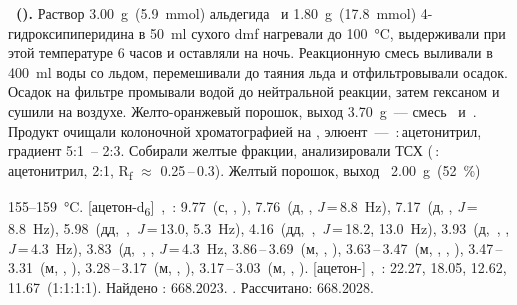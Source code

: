 \textbf{~().}
Раствор \SI{3.00}{\gram}~(\SI{5.9}{\mmol}) альдегида~ и \SI{1.80}{\gram}~(\SI{17.8}{\mmol}) 4-гидроксипиперидина в \SI{50}{\milli\litre} сухого \ac{dmf} нагревали до \SI{100}{\celsius}, выдерживали при этой температуре 6 часов и оставляли на ночь.
Реакционную смесь выливали в \SI{400}{\milli\litre} воды со льдом, перемешивали до таяния льда и отфильтровывали осадок.
Осадок на фильтре промывали водой до нейтральной реакции, затем гексаном и сушили на воздухе.
Желто-оранжевый порошок, выход \SI{3.70}{\gram}~--- смесь~ и~.
Продукт очищали колоночной хроматографией на , элюент~--- \,:\,ацетонитрил, градиент 5:1~-- 2:3. Собирали желтые фракции, анализировали ТСХ (\,:\,ацетонитрил, 2:1, R\textsubscript{f} $\approx$ 0.25\,--\,0.3).
Желтый порошок, выход~ \SI{2.00}{\gram}~(\SI{52}{\percent})
\begin{experimental}[]
     155--\SI{159}{\celsius}.
    [ацетон­-d\textsubscript{6}]~\chemdelta{},~\si{\ppm}: 9.77~(с, , ), 7.76~(д, , \textit{J}\,=\,8.8~\si{\hertz}), 7.17~(д, , \textit{J}\,=\,8.8~\si{\hertz}), 5.98~(дд,~,~\textit{J}\,=\,13.0, 5.3~\si{\hertz}), 4.16~(дд,~,~\textit{J}\,=\,18.2, 13.0~\si{\hertz}), 3.93~(д,~, , \textit{J}\,=\,4.3~\si{\hertz}), 3.83~(д,~, , \textit{J}\,=\,4.3~\si{\hertz}, 3.86\,--\,3.69~(м, , ), 3.63\,--\,3.47~(м, , , ), 3.47\,--\,3.31~(м, , ), 3.28\,--\,3.17~(м, , ), 3.17\,--\,3.03~(м, , ).
    [ацетон-] \chemdelta,~\si{\ppm}: 22.27, 18.05, 12.62, 11.67~(1:1:1:1).
     Найдено \ce{[M+]}: \num{668.2023}. . Рассчитано:  \num{668.2028}.
\end{experimental}

